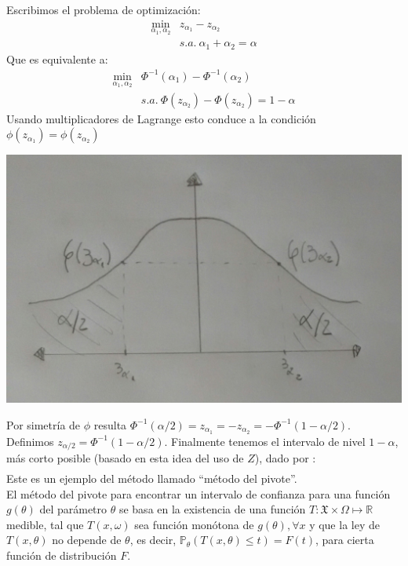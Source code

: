 \documentclass[10pt]{article}
\theoremstyle{plain}
\theoremstyle{definition}
\begin{document}
Escribimos el problema de optimización:
\begin{align*}
\min_{\alpha_{1}, \alpha_{2}} &z_{\alpha_{1}}-z_{\alpha_{2}}\\
& s.a.\ \alpha_{1}+\alpha_{2}= \alpha
\end{align*}
Que es equivalente a:
\begin{align*}
\min_{\alpha_{1}, \alpha_{2}} &\Phi^{-1}(\alpha_{1})-\Phi^{-1}(\alpha_{2})\\
& s.a.\ \Phi(z_{\alpha_{2}}) - \Phi(z_{\alpha_{2}})= 1-\alpha
\end{align*}
Usando multiplicadores de Lagrange esto conduce a la condición $\phi(z_{\alpha_{1}}) = \phi(z_{\alpha_{2}})$
\begin{center}
\includegraphics[scale=0.2]{imagenes/normal4.jpg}
\end{center}
Por simetría de $\phi$ resulta $\Phi^{-1}(\alpha/2)= z_{\alpha_{1}} = -z_{\alpha_{2}} = - \Phi^{-1}(1-\alpha/2)$.\\
Definimos $z_{\alpha/2} = \Phi^{-1}(1-\alpha/2)$. Finalmente tenemos el intervalo de nivel $1-\alpha$, más corto posible (basado en esta idea del uso de $Z$), dado por :
\begin{align*}
[\bar{X}-z_{\alpha/2}\frac{\sigma}{\sqrt{n}}, \bar{X}+z_{\alpha/2}\frac{\sigma}{\sqrt{n}}]
\end{align*}
Este es un ejemplo del método llamado ``método del pivote''.\\

El método del pivote para encontrar un intervalo de confianza para una función $g(\theta)$ del parámetro $\theta$ se basa en la existencia de una función $T: \mathfrak{X} \times \Omega \mapsto \mathbb{R}$ medible, tal que $T(x,\omega)$ sea función monótona de $g(\theta), \forall x$ y que la ley de $T(x,\theta)$ no depende de $\theta$, es decir, $\mathbb{P}_{\theta}(T(x,\theta)\le t) = F(t)$, para cierta función de distribución $F$.\\
\end{document}
